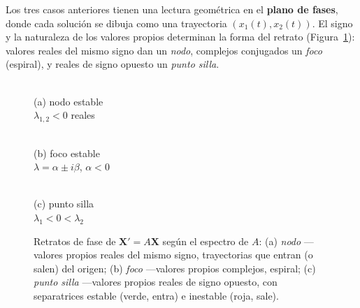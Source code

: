 Los tres casos anteriores tienen una lectura geométrica en el \textbf{plano de fases}, donde cada solución se dibuja como una trayectoria $(x_1(t),x_2(t))$. El signo y la naturaleza de los valores propios determinan la forma del retrato (Figura~\ref{fig:plano_fases}): valores reales del mismo signo dan un \emph{nodo}, complejos conjugados un \emph{foco} (espiral), y reales de signo opuesto un \emph{punto silla}.

\begin{figure}[!htbp]
\centering
\begin{minipage}{0.32\textwidth}
\centering
{}\\[-2pt]
{\scriptsize (a) nodo estable\\ $\lambda_{1,2}<0$ reales}
\end{minipage}\hfill
\begin{minipage}{0.32\textwidth}
\centering
{}\\[-2pt]
{\scriptsize (b) foco estable\\ $\lambda=\alpha\pm i\beta$, $\alpha<0$}
\end{minipage}\hfill
\begin{minipage}{0.32\textwidth}
\centering
{}\\[-2pt]
{\scriptsize (c) punto silla\\ $\lambda_1<0<\lambda_2$}
\end{minipage}
\caption{Retratos de fase de $\mathbf{X}'=A\mathbf{X}$ según el espectro de $A$: (a) \emph{nodo} —valores propios reales del mismo signo, trayectorias que entran (o salen) del origen; (b) \emph{foco} —valores propios complejos, espiral; (c) \emph{punto silla} —valores propios reales de signo opuesto, con separatrices estable (verde, entra) e inestable (roja, sale).}
\label{fig:plano_fases}
\end{figure}

